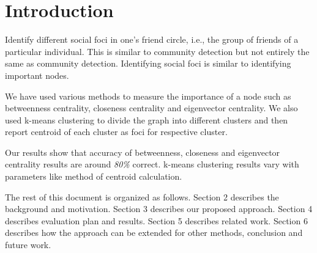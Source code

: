 \section{Introduction}
\label{intro}

Identify different social foci in one’s friend circle, i.e., the group
of friends of a particular individual. This is similar to community
detection but not entirely the same as community detection. Identifying
social foci is similar to identifying important nodes.

We have used various methods to measure the importance of a node
such as betweenness centrality, closeness centrality and eigenvector
centrality.  We also used k-means clustering to divide the graph into
different clusters and then report centroid of each cluster as foci
for respective cluster.

Our results show that accuracy of betweenness, closeness and eigenvector
centrality results are around \emph{80\%} correct. k-means clustering
results vary with parameters like method of centroid calculation.



%
%

The rest of this document is organized as follows.  Section 2
describes the background and motivation.  Section
3 describes our proposed approach.  Section 4 describes evaluation plan
and results.  Section 5 describes related work.  Section 6 describes
how the approach can be extended for other methods,
conclusion and future work.

